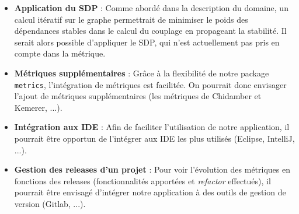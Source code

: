 \documentclass{scrartcl}
\begin{document}
\begin{itemize}
        \item \textbf{Application du SDP} : Comme abordé dans la description du domaine, un calcul itératif sur le graphe permettrait de minimiser le poids des dépendances stables dans le calcul du couplage en propageant la stabilité. Il serait alors possible d'appliquer le SDP, qui n'est actuellement pas pris en compte dans la métrique.
        
        \item \textbf{Métriques supplémentaires} : Grâce à la flexibilité de notre package \texttt{metrics}, l'intégration de métriques est facilitée. On pourrait donc envisager l'ajout de métriques supplémentaires (les métriques de Chidamber et Kemerer, ...).
        
        \item \textbf{Intégration aux IDE} : Afin de faciliter l'utilisation de notre application, il pourrait être opportun de l'intégrer aux IDE les plus utilisés (Eclipse, IntelliJ, ...).
        
        \item \textbf{Gestion des releases d'un projet} : Pour voir l'évolution des métriques en fonctions des releases (fonctionnalités apportées et \emph{refactor} effectués), il pourrait être envisagé d'intégrer notre application à des outils de gestion de version (Gitlab, ...).
       
    \end{itemize}




\pagebreak


\end{document}
